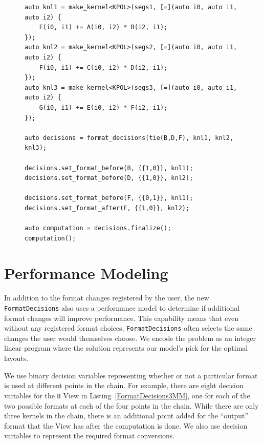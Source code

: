 \documentclass[sigconf, table]{acmart}
\begin{document}
\begin{figure}
\begin{lstlisting}[caption={The 3MM benchmark implemented using FormatDecisions.},
	label={FormatDecisions3MM}]
auto knl1 = make_kernel<KPOL>(segs1, [=](auto i0, auto i1, auto i2) {
	E(i0, i1) += A(i0, i2) * B(i2, i1);
});
auto knl2 = make_kernel<KPOL>(segs2, [=](auto i0, auto i1, auto i2) {
	F(i0, i1) += C(i0, i2) * D(i2, i1);
});
auto knl3 = make_kernel<KPOL>(segs3, [=](auto i0, auto i1, auto i2) {
	G(i0, i1) += E(i0, i2) * F(i2, i1);
});

auto decisions = format_decisions(tie(B,D,F), knl1, knl2, knl3);

decisions.set_format_before(B, {{1,0}}, knl1);
decisions.set_format_before(D, {{1,0}}, knl2);

decisions.set_format_before(F, {{0,1}}, knl1);
decisions.set_format_after(F, {{1,0}}, knl2);

auto computation = decisions.finalize();
computation();
\end{lstlisting}

\end{figure}

\section{Performance Modeling}

In addition to the format changes registered by the user, the new \verb.FormatDecisions. also uses a performance model to determine if additional format changes will improve performance. 
This capability means that even without any registered format choices, \verb.FormatDecisions. often selects the same changes the user would themselves choose. 
We encode the problem as an integer linear program where the solution represents our model's pick for the optimal layouts.


We use binary decision variables representing whether or not a particular format is used at different points in the chain. 
For example, there are eight decision variables for the \verb.B. View in Listing~\ref{FormatDecisions3MM}, one for each of the two possible formats at each of the four points in the chain. 
While there are only three kernels in the chain, there is an additional point added for the \enquote{output} format that the View has after the computation is done. 
We also use decision variables to represent the required format conversions.
\end{document}
